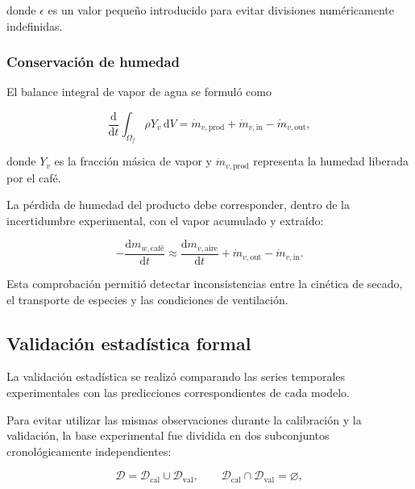 donde $\epsilon$ es un valor pequeño introducido para evitar divisiones numéricamente indefinidas.

\subsubsection{Conservación de humedad}
\label{subsubsec:conservacion_humedad}

El balance integral de vapor de agua se formuló como

\begin{equation}
\frac{\mathrm{d}}{\mathrm{d}t}
\int_{\Omega_f}
\rho Y_v\,\mathrm{d}V
=
\dot m_{v,\mathrm{prod}}
+
\dot m_{v,\mathrm{in}}
-
\dot m_{v,\mathrm{out}},
\label{eq:balance_integral_humedad}
\end{equation}

donde $Y_v$ es la fracción másica de vapor y $\dot m_{v,\mathrm{prod}}$ representa la humedad liberada por el café.

La pérdida de humedad del producto debe corresponder, dentro de la incertidumbre experimental, con el vapor acumulado y extraído:

\begin{equation}
-\frac{\mathrm{d}m_{w,\mathrm{café}}}{\mathrm{d}t}
\approx
\frac{\mathrm{d}m_{v,\mathrm{aire}}}{\mathrm{d}t}
+
\dot m_{v,\mathrm{out}}
-
\dot m_{v,\mathrm{in}}.
\label{eq:acoplamiento_humedad}
\end{equation}

Esta comprobación permitió detectar inconsistencias entre la cinética de secado, el transporte de especies y las condiciones de ventilación.

\subsection{Validación estadística formal}
\label{subsec:validacion_estadistica_formal}

La validación estadística se realizó comparando las series temporales experimentales con las predicciones correspondientes de cada modelo.

Para evitar utilizar las mismas observaciones durante la calibración y la validación, la base experimental fue dividida en dos subconjuntos cronológicamente independientes:

\begin{equation}
\mathcal{D}
=
\mathcal{D}_{\mathrm{cal}}
\cup
\mathcal{D}_{\mathrm{val}},
\qquad
\mathcal{D}_{\mathrm{cal}}
\cap
\mathcal{D}_{\mathrm{val}}
=
\varnothing,
\end{equation}


